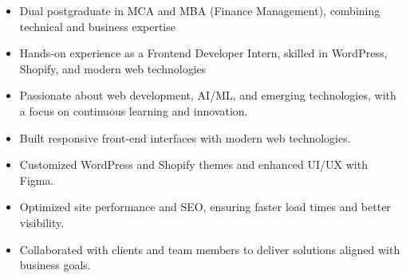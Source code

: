 \documentclass[10pt,a4paper,ragged2e]{altacv}
\begin{document}
\tagline{}

\begin{fullwidth}
\makecvheader
\end{fullwidth}


\begin{itemize}
\item Dual postgraduate in MCA and MBA (Finance Management), combining technical and business expertise
\smallskip
\item Hands-on experience as a Frontend Developer Intern, skilled in WordPress, Shopify, and modern web technologies
\smallskip
\item Passionate about web development, AI/ML, and emerging technologies, with a focus on continuous learning and innovation.
 \end{itemize}
\smallskip


\begin{itemize}
\item Built responsive front-end interfaces with modern web technologies.
\smallskip
\item Customized WordPress and Shopify themes and enhanced UI/UX with Figma.
\smallskip
\item Optimized site performance and SEO, ensuring faster load times and better visibility. 
\smallskip
\item Collaborated with clients and team members to deliver solutions aligned with business goals.
\end{itemize}
\smallskip

\end{document}
